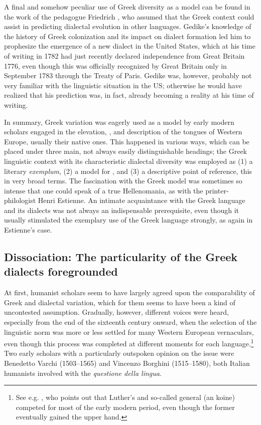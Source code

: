 A final and somehow peculiar use of Greek diversity as a model can be found in the work of the  pedagogue Friedrich \citet[7]{Gedike1782}, who assumed that the Greek context could assist in predicting dialectal evolution in other languages. Gedike’s knowledge of the history of Greek colonization and its impact on dialect formation led him to prophesize the emergence of a new  dialect in the United States, which at his time of writing in 1782 had just recently declared independence from Great Britain 1776, even though this was officially recognized by Great Britain only in September 1783 through the Treaty of Paris. Gedike was, however, probably not very familiar with the linguistic situation in the US; otherwise he would have realized that his prediction was, in fact, already becoming a reality at his time of writing.

In summary, Greek variation was eagerly used as a model by early modern scholars engaged in the elevation, , and description of the  tongues of Western Europe, usually their native ones. This happened in various ways, which can be placed under three main, not always easily distinguishable headings; the Greek linguistic context with its characteristic dialectal diversity was employed as (1) a literary \textit{exemplum}, (2) a model for , and (3) a descriptive point of reference, this in very broad terms. The fascination with the Greek model was sometimes so intense that one could speak of a true Hellenomania, as with the printer-philologist Henri Estienne. An intimate acquaintance with the Greek language and its dialects was not always an indispensable prerequisite, even though it usually stimulated the exemplary use of the Greek language strongly, as again in Estienne’s case.

\subsection{Dissociation: The particularity of the Greek dialects foregrounded}\label{sec:8.1.3}

At first, humanist scholars seem to have largely agreed upon the comparability of Greek and  dialectal variation, which for them seems to have been a kind of uncontested assumption. Gradually, however, different voices were heard, especially from the end of the sixteenth century onward, when the selection of the linguistic norm was more or less settled for many Western European vernaculars, even though this process was completed at different moments for each language.\footnote{See e.g. \citet[217--222]{Mattheier2003}, who points out that Luther’s  and so-called general  (an  koine) competed for most of the early modern period, even though the former eventually gained the upper hand.} Two early scholars with a particularly outspoken opinion on the issue were Benedetto Varchi (1503–1565) and Vincenzo Borghini (1515–1580), both Italian humanists involved with the \textit{questione della lingua}.

